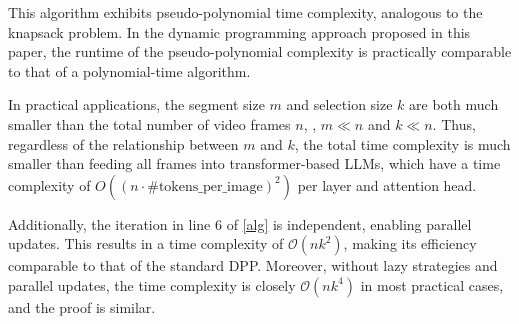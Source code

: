 This algorithm exhibits pseudo-polynomial time complexity, analogous to the knapsack problem. 
In the dynamic programming approach proposed in this paper, the runtime of the pseudo-polynomial complexity is practically comparable to that of a polynomial-time algorithm.

In practical applications, the segment size $m$ and selection size $k$ are both much smaller than the total number of video frames $n$, \ie, $m \ll n$ and $k \ll n$. 
Thus, regardless of the relationship between $m$ and $k$, the total time complexity is much smaller than feeding all frames into transformer-based LLMs, which have a time complexity of $O((n \cdot \text{\#tokens\_per\_image})^2)$ per layer and attention head.

Additionally, the iteration in line 6 of \cref{alg} is independent, enabling parallel updates. 
This results in a time complexity of \(\mathcal{O}(nk^2)\), making its efficiency comparable to that of the standard DPP. 
Moreover, without lazy strategies and parallel updates, the time complexity is closely \(\mathcal{O}(nk^4)\) in most practical cases, and the proof is similar.



